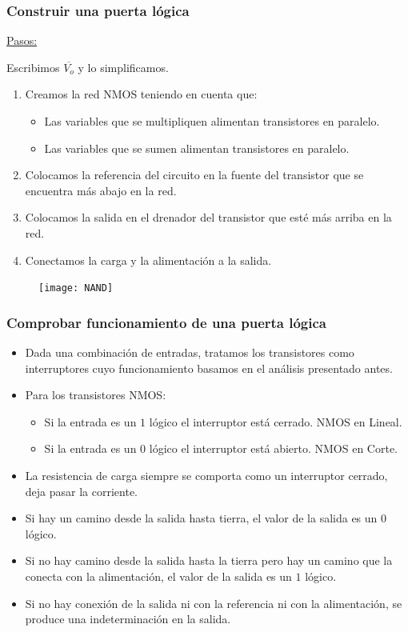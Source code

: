\documentclass[10pt,a4paper]{article}
\begin{document}
	\subsubsection{Construir una puerta lógica}
	
	\underline{Pasos:} \newline
	
	Escribimos $\overline{V_o}$ y lo simplificamos.
	
	\begin{enumerate}
		\item Creamos la red NMOS teniendo en cuenta que:
		\begin{itemize}
			\item Las variables que se multipliquen alimentan transistores en paralelo.
			\item Las variables que se sumen alimentan transistores en paralelo.
		\end{itemize}
		\item Colocamos la referencia del circuito en la fuente del transistor que se encuentra más abajo en la red.
		\item Colocamos la salida en el drenador del transistor que esté más arriba en la red.
		\item Conectamos la carga y la alimentación a la salida.
	\end{enumerate}
	
	\begin{figure}[h]
		\centering
		\texttt{[image: NAND]}
	\end{figure}

	\subsubsection{Comprobar funcionamiento de una puerta lógica}
	
	\begin{itemize}
		\item Dada una combinación de entradas, tratamos los transistores como interruptores cuyo funcionamiento basamos en el análisis presentado antes.
		\item Para los transistores NMOS:
		\begin{itemize}
			\item Si la entrada es un $1$ lógico el interruptor está cerrado. NMOS en Lineal.
			\item Si la entrada es un $0$ lógico el interruptor está abierto. NMOS en Corte.
		\end{itemize}
		\item La resistencia de carga siempre se comporta como un interruptor cerrado, deja pasar la corriente.
		\item Si hay un camino desde la salida hasta tierra, el valor de la salida es un $0$ lógico.
		\item Si no hay camino desde la salida hasta la tierra pero hay un camino que la conecta con la alimentación, el valor de la salida es un $1$ lógico.
		\item Si no hay conexión de la salida ni con la referencia ni con la alimentación, se produce una indeterminación en la salida.
	\end{itemize}
\end{document}
